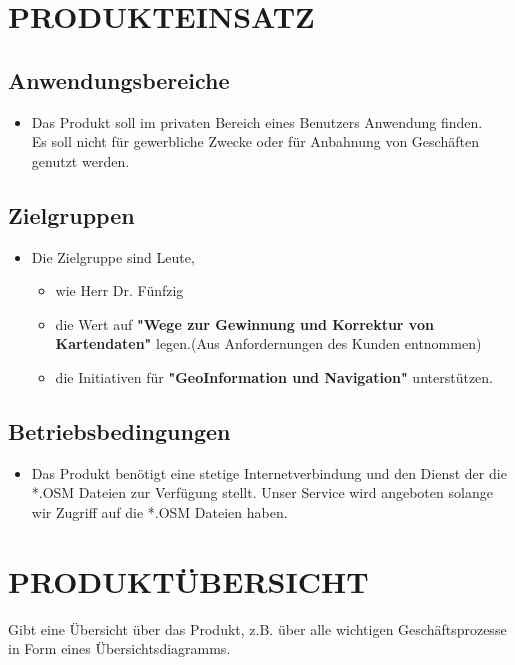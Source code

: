 	
	\section{\Large PRODUKTEINSATZ}
	\subsection{Anwendungsbereiche}
	\begin{itemize}
		\item Das Produkt soll im privaten Bereich eines Benutzers Anwendung finden.\\
		Es soll nicht für gewerbliche Zwecke oder für Anbahnung von Geschäften genutzt werden.
	\end{itemize}
	\subsection{Zielgruppen}
	\begin{itemize}
		\item Die Zielgruppe sind Leute, 
		\begin{itemize}
			\item wie Herr Dr. Fünfzig
			\item die Wert auf \textbf{"Wege zur Gewinnung und Korrektur von Kartendaten"} legen.(Aus Anfordernungen des Kunden entnommen)
			\item die Initiativen für \textbf{"GeoInformation und Navigation"} unterstützen.
		\end{itemize}
	\end{itemize}
	\subsection{Betriebsbedingungen}
	\begin{itemize}
		\item Das Produkt benötigt eine stetige Internetverbindung und den Dienst der die *.OSM Dateien zur Verfügung stellt. Unser Service wird angeboten solange wir Zugriff auf die *.OSM Dateien haben.
	\end{itemize}
	
	
	\section{\Large PRODUKTÜBERSICHT}
	Gibt eine Übersicht über das Produkt, z.B. über alle wichtigen Geschäftsprozesse in Form eines Übersichtsdiagramms.
